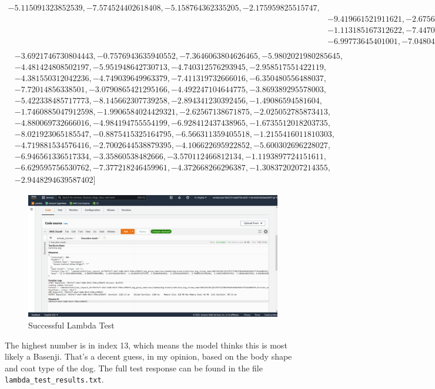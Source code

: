 \documentclass[11pt]{amsart}
\begin{document}
{\begin{align*}
      -5.115091323852539, -7.574524402618408, -5.158764362335205, -2.175959825515747,\\&
       -9.419661521911621, -2.6756057739257812, -6.178658962249756, -5.340219974517822, \\&
       -1.113185167312622, -7.447085380554199, -0.99626624584198, -1.6738048791885376, \\&
       -6.99773645401001, -7.048044204711914, -1.6650669574737549, -8.459725379943848, \\&
             \end{align*}
\begin{align*}
       &-3.6921746730804443, -0.7576943635940552, -7.3646063804626465, -5.9802021980285645,\\&
        -4.481424808502197, -5.951948642730713, -4.740312576293945, -2.958517551422119, \\&
        -4.381550312042236, -4.749039649963379, -7.411319732666016, -6.350480556488037,\\&
         -7.72014856338501, -3.0790865421295166, -4.492247104644775, -3.869389295578003, \\&
         -5.422338485717773, -8.145662307739258, -2.894341230392456, -1.49086594581604, \\&
         -1.7460885047912598, -1.9906584024429321, -2.62567138671875, -2.025052785873413, \\&
         -4.880069732666016, -4.984194755554199, -6.928412437438965, -1.6735512018203735,\\&
          -8.021923065185547, -0.8875415325164795, -6.566311359405518, -1.2155416011810303,\\&
           -4.719881534576416, -2.7002644538879395, -4.106622695922852, -5.600302696228027, \\&
           -6.946561336517334, -3.35860538482666, -3.570112466812134, -1.1193897724151611, \\&
           -6.629595756530762, -7.377218246459961, -4.372668266296387, -1.3083720207214355,\\& -2.9448294639587402]
\end{align*}}
\begin{figure}[h]
\includegraphics[width=\textwidth]{test_success.png}
\caption{Successful Lambda Test}
\label{fig:test}
\end{figure}
The highest number is in index 13, which means the model thinks this is most likely a Basenji. That's a decent guess, in my opinion, based on the body shape and coat type of the dog. The full test response can be found in the file \verb^lambda_test_results.txt^.
\end{document}
